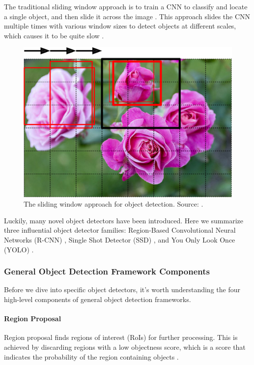 \documentclass[a4paper, 11pt, oneside]{article}
\begin{document}
The traditional sliding window approach is to train a CNN to classify and locate a single object, and then slide it
across the image \cite{geron2019hands, girshick2014rich, pasquet2017amphora, redmon2016you}. This approach slides the
CNN multiple times with various window sizes to detect objects at different scales, which causes it to be quite slow
\cite{geron2019hands}.

\begin{figure}[ht]
  \begin{center}
    \includegraphics[width=.5\textwidth]{sliding_window.png}
  \end{center}
  \caption{The sliding window approach for object detection. Source: \cite{o2019deep}.}
\end{figure}

Luckily, many novel object detectors have been introduced. Here we summarize three influential object detector families:
Region-Based Convolutional Neural Networks (R-CNN) \cite{girshick2014rich, girshick2015fast, ren2015faster}, Single Shot
Detector (SSD) \cite{liu2016ssd}, and You Only Look Once (YOLO)
\cite{redmon2016you, redmon2017yolo9000, redmon2018yolov3, bochkovskiy2020yolov4, yolov5}.

\subsubsection{General Object Detection Framework Components}

\label{sec:generalobjectdetection}

Before we dive into specific object detectors, it's worth understanding the four high-level components of
general object detection frameworks.

\paragraph{Region Proposal}

Region proposal finds regions of interest (RoIs) for further processing. This is achieved by discarding regions with a
low objectness score, which is a score that indicates the probability of the region containing objects
\cite{alexe2012measuring}.
\end{document}
